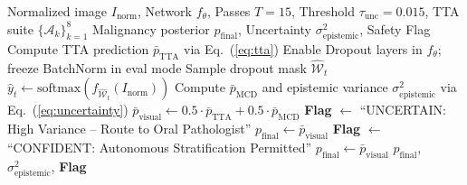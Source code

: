 \documentclass[journal]{IEEEtran}
\begin{document}
\begin{algorithm}[t]
\caption{Variational Bayesian Triage Pipeline}
\label{alg:bayesian_inference}
\begin{algorithmic}[1]
\REQUIRE Normalized image $I_{\text{norm}}$, Network $f_\theta$, Passes $T=15$, Threshold $\tau_{\text{unc}} = 0.015$, TTA suite $\{\mathcal{A}_k\}_{k=1}^8$
\ENSURE Malignancy posterior $p_{\text{final}}$, Uncertainty $\sigma^2_{\text{epistemic}}$, Safety Flag
\STATE Compute TTA prediction $\bar{p}_{\text{TTA}}$ via Eq.~(\ref{eq:tta})
\STATE Enable Dropout layers in $f_\theta$; freeze BatchNorm in eval mode
    \STATE Sample dropout mask $\hat{\mathcal{W}}_t$
    \STATE $\hat{y}_t \leftarrow \text{softmax}(f_{\hat{\mathcal{W}}_t}(I_{\text{norm}}))$
\ENDFOR
\STATE Compute $\bar{p}_{\text{MCD}}$ and epistemic variance $\sigma^2_{\text{epistemic}}$ via Eq.~(\ref{eq:uncertainty})
\STATE $\bar{p}_{\text{visual}} \leftarrow 0.5 \cdot \bar{p}_{\text{TTA}} + 0.5 \cdot \bar{p}_{\text{MCD}}$
    \STATE \textbf{Flag} $\leftarrow$ ``UNCERTAIN: High Variance -- Route to Oral Pathologist''
    \STATE $p_{\text{final}} \leftarrow \bar{p}_{\text{visual}}$
\ELSE
    \STATE \textbf{Flag} $\leftarrow$ ``CONFIDENT: Autonomous Stratification Permitted''
    \STATE $p_{\text{final}} \leftarrow \bar{p}_{\text{visual}}$
\ENDIF
\RETURN $p_{\text{final}}$, $\sigma^2_{\text{epistemic}}$, \textbf{Flag}
\end{algorithmic}
\end{algorithm}
\end{document}
